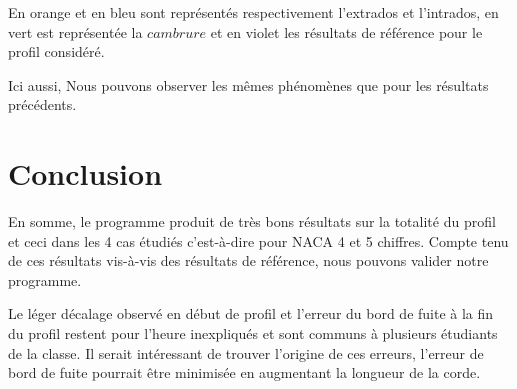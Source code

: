 \documentclass[a4paper,oneside]{article}
\begin{document}
%  



En orange et en bleu sont représentés respectivement l'extrados et l'intrados, en vert est représentée la $cambrure$ et en violet les résultats de référence pour le profil considéré.

Ici aussi, Nous pouvons observer les mêmes phénomènes que pour les résultats précédents.
\section{Conclusion}

En somme, le programme produit de très bons résultats sur la totalité du profil et ceci dans les 4 cas étudiés c'est-à-dire pour NACA 4 et 5 chiffres. Compte tenu de ces résultats vis-à-vis des résultats de référence, nous pouvons valider notre programme. 


Le léger décalage observé en début de profil et l'erreur du bord de fuite à la fin du profil restent pour l'heure inexpliqués et sont communs à plusieurs étudiants de la classe. Il serait intéressant de trouver l'origine de ces erreurs, l'erreur de bord de fuite pourrait être minimisée en augmentant la longueur de la corde.


 
\end{document}
